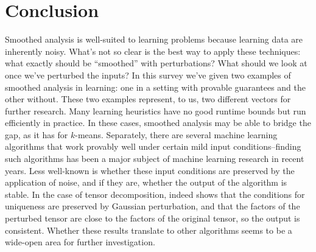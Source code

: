 \documentclass[11pt]{article}
\theoremstyle{definition}
\begin{document}
\section{Conclusion}
Smoothed analysis is well-suited to learning problems because learning
data are inherently noisy. What's not so clear is the best way to
apply these techniques: what exactly should be ``smoothed'' with
perturbations? What should we look at once we've perturbed the inputs?
In this survey we've given two examples of smoothed analysis in
learning: one in a setting with provable guarantees and the other
without. These two examples represent, to us, two different vectors
for further research. Many learning heuristics have no good runtime
bounds but run efficiently in practice. In these cases, smoothed
analysis may be able to bridge the gap, as it has for $k$-means. Separately, there are several machine learning
algorithms that work provably well under certain mild input
conditions--finding such algorithms has been a major subject of
machine learning research in recent years. Less well-known is whether these
input conditions are preserved by the application of noise, and if
they are, whether the output of the algorithm is stable. In the case
of tensor decomposition, \cite{TD} indeed shows that the conditions
for uniqueness are preserved by Gaussian perturbation, and that the
factors of the perturbed tensor are close to the factors of the
original tensor, so the output is consistent. Whether these results translate to other algorithms seems to be a wide-open area for further investigation.
\end{document}
